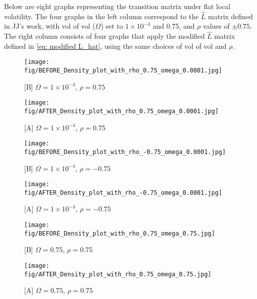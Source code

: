 \documentclass[12pt]{article}
\begin{document}
Below are eight graphs representing the transition matrix under flat local volatility. The four graphs in the left column correspond to the $\hat{L}$ matrix defined in JJ's work, with vol of vol ($\Omega$) set to $1 \times 10^{-4}$ and 0.75, and $\rho$ values of $\pm 0.75$. The right column consists of four graphs that apply the modified $\hat{L}$ matrix defined in \eqref{eq: modified L_hat}, using the same choices of vol of vol and $\rho$.

\begin{figure}[ht]
    \centering
    \begin{minipage}{0.45\textwidth}
        \centering
        \texttt{[image: fig/BEFORE\_Density\_plot\_with\_rho\_0.75\_omega\_0.0001.jpg]}
        \caption{[B] \(\Omega = 1 \times 10^{-4}\), \(\rho = 0.75\)}
    \end{minipage}
    \hfill
    \begin{minipage}{0.45\textwidth}
        \centering
        \texttt{[image: fig/AFTER\_Density\_plot\_with\_rho\_0.75\_omega\_0.0001.jpg]}
        \caption{[A] \(\Omega = 1 \times 10^{-4}\), \(\rho = 0.75\)}
    \end{minipage}

    \vspace{1em}

    \begin{minipage}{0.45\textwidth}
        \centering
        \texttt{[image: fig/BEFORE\_Density\_plot\_with\_rho\_-0.75\_omega\_0.0001.jpg]}
        \caption{[B] \(\Omega = 1 \times 10^{-4}\), \(\rho = -0.75\)}
    \end{minipage}
    \hfill
    \begin{minipage}{0.45\textwidth}
        \centering
        \texttt{[image: fig/AFTER\_Density\_plot\_with\_rho\_-0.75\_omega\_0.0001.jpg]}
        \caption{[A] \(\Omega = 1 \times 10^{-4}\), \(\rho = -0.75\)}
    \end{minipage}

    \vspace{1em}

    \begin{minipage}{0.45\textwidth}
        \centering
        \texttt{[image: fig/BEFORE\_Density\_plot\_with\_rho\_0.75\_omega\_0.75.jpg]}
        \caption{[B] \(\Omega = 0.75\), \(\rho = 0.75\)} \label{fig: before change, 0.75 omega and 0.75 rho}
    \end{minipage}
    \hfill
    \begin{minipage}{0.45\textwidth}
        \centering
        \texttt{[image: fig/AFTER\_Density\_plot\_with\_rho\_0.75\_omega\_0.75.jpg]} 
        \caption{[A] \(\Omega = 0.75\), \(\rho = 0.75\)} \label{fig: after change, 0.75 omega and 0.75 rho}
    \end{minipage}


\end{figure}
\end{document}
